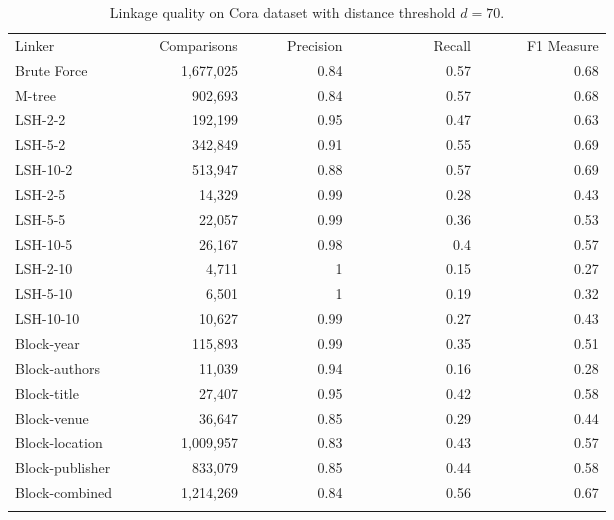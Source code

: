 \documentclass{llncs}
\begin{document}
\begin{table}[t]
\caption{Linkage quality on Cora dataset with distance threshold
  $d= 70$.}
  \label{comparison-of-results-cora}
  \centering
  \begin{footnotesize}
  \begin{tabular}{lrrrr} \hline\noalign{\smallskip}
  Linker~~~~~~~~~~ & ~~~Comparisons & ~~~~~Precision & 
  ~~~~~~~~~~~Recall & ~~~~~~F1 Measure \\
  \noalign{\smallskip} \hline \noalign{\smallskip}
Brute Force        & 1,677,025                 & 0.84      & 0.57   & 0.68  \\
\noalign{\smallskip} \hline \noalign{\smallskip}
M-tree              &  902,693                  & 0.84      & 0.57   & 0.68       \\
\noalign{\smallskip} \hline \noalign{\smallskip}
LSH-2-2            &  192,199	& 0.95	& 0.47	& 0.63       \\
LSH-5-2            &  342,849	& 0.91	& 0.55	& 0.69       \\
LSH-10-2           &  513,947	& 0.88	& 0.57	& 0.69       \\
LSH-2-5            &  14,329	& 0.99	& 0.28	& 0.43      \\
LSH-5-5            &  22,057	& 0.99	& 0.36	& 0.53       \\
LSH-10-5           &  26,167	& 0.98	& 0.4	& 0.57      \\
LSH-2-10           &  4,711	& 1	& 0.15	& 0.27    \\
LSH-5-10           &  6,501	& 1	& 0.19	& 0.32      \\
LSH-10-10          & 10,627  	& 0.99	& 0.27& 	0.43       \\
\noalign{\smallskip} \hline \noalign{\smallskip}
Block-year         &  115,893                  & 0.99      & 0.35   & 0.51       \\
Block-authors      &   11,039                   & 0.94      & 0.16   & 0.28       \\
Block-title        &   27,407                   & 0.95      & 0.42   & 0.58       \\
Block-venue        &   36,647                   & 0.85      & 0.29   & 0.44       \\
Block-location     & 1,009,957                 & 0.83      & 0.43   & 0.57       \\
Block-publisher    &  833,079                  & 0.85      & 0.44   & 0.58       \\
Block-combined     & 1,214,269                 & 0.84      & 0.56   & 0.67       \\
\noalign{\smallskip} \hline
\end{tabular}
\end{footnotesize}
\end{table}
\end{document}
